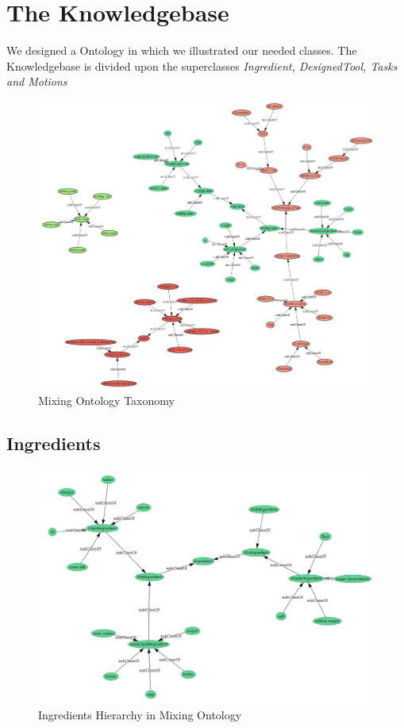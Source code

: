 \section{The Knowledgebase}
We designed a Ontology in which we illustrated our needed classes. 
The Knowledgebase is divided upon the superclasses \textit{Ingredient, DesignedTool, Tasks and Motions }
\begin{figure}[H]
    \includegraphics[scale=0.5]{Graphics/classHierarchy/taxonomy.png}
    \centering
    \caption{Mixing Ontology Taxonomy}
\end{figure}

\subsection{Ingredients}

\begin{figure}[H]
    \includegraphics[scale=0.45]{Graphics/classHierarchy/ingredients_hierarchy.png}
    \centering
    \caption{Ingredients Hierarchy in Mixing Ontology}
\end{figure}

